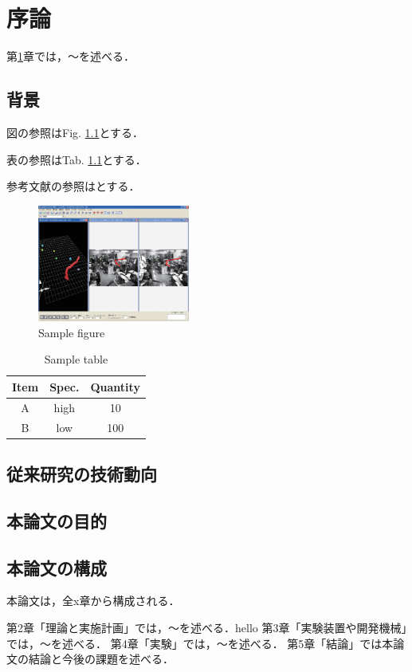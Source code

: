 ﻿%

\chapter{序論}\label{chapter:序論}
第\ref{chapter:序論}章では，～を述べる．


\section{背景}

図の参照はFig. \ref{fig:sample}とする．

表の参照はTab. \ref{table:sample}とする．

参考文献の参照は\cite{実用的4足歩行機械}とする．

\begin{figure}[tbp]
  \begin{center}
    \includegraphics[width=50mm, clip]{figure1/sample.eps}
    \caption{Sample figure}
    \label{fig:sample}
  \end{center}
\end{figure}

\begin{table}[tbp]
    \caption{Sample table}
    \label{table:sample}
    \begin{center}
        \begin{tabular}{|c|c|c|}
        \hline
        Item & Spec. & Quantity  \\
        \hline\hline
        A & high & 10 \\
        \hline
        B & low & 100 \\
        \hline
        \end{tabular}
    \end{center}
\end{table}


\section{従来研究の技術動向}

\section{本論文の目的}

\section{本論文の構成}
本論文は，全x章から構成される．

第2章「理論と実施計画」では，～を述べる．hello
第3章「実験装置や開発機械」では，～を述べる．
第4章「実験」では，～を述べる．
第5章「結論」では本論文の結論と今後の課題を述べる．



